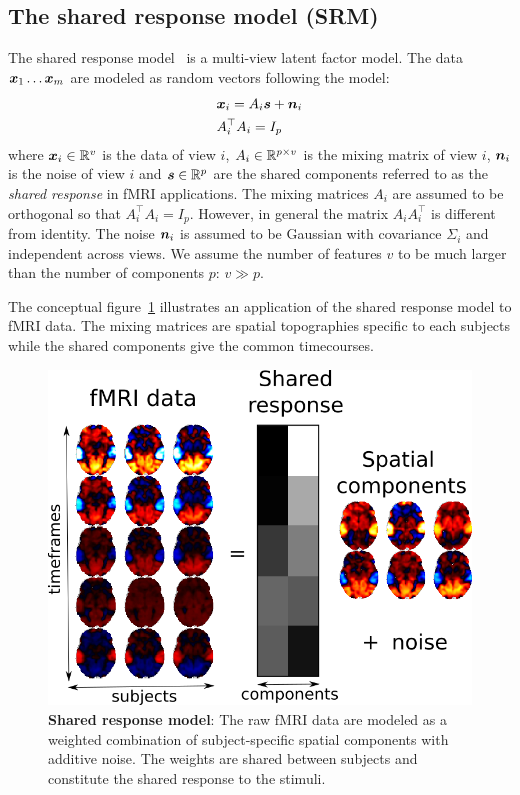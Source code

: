 \subsection{The shared response model (SRM)}
\label{sec:srm:review}
The shared response model~\cite{chen2015reduced} is a multi-view latent factor
model. The data $\boldsymbol{x}_1 \dots \boldsymbol{x}_m$ are modeled as random vectors following the model:
\begin{align}
 &\boldsymbol{x}_i = A_i \boldsymbol{s} + \boldsymbol{n}_i \\
  &A_i^{\top}A_i = I_p
  \label{eq:model:srm}
\end{align}
where $\boldsymbol{x}_i \in \mathbb{R}^v$ is the data of view $i$, $A_i \in \mathbb{R}^{p \times v}$ is the
mixing matrix of view $i$, $\boldsymbol{n}_i$ is the noise of view $i$ and $\boldsymbol{s} \in \mathbb{R}^p$ are the
shared components referred to as the \emph{shared response} in fMRI applications.
The mixing matrices
$A_i$ are assumed to be orthogonal so that $A_i^{\top}A_i = I_p$. However, in
general the matrix $A_i A_i^{\top}$ is different from identity. The noise
$\boldsymbol{n}_i$ is assumed to be Gaussian with covariance $\Sigma_i$ and independent
across views. We assume the number of features $v$ to be much larger than the
number of components $p$: $v \gg p$.

The conceptual figure~\ref{fig:srm:conceptual_figure} illustrates an 
application of the shared response model to fMRI data. The mixing
matrices are spatial topographies specific to each subjects while the shared
components give the common timecourses.

\begin{figure}
  \centering
  \includegraphics[scale=0.3]{figures/srm/conceptual_figure31.png}
  \caption{\textbf{Shared response model}: The raw fMRI data are modeled as a weighted combination of subject-specific spatial components with additive noise. The weights are shared between subjects and constitute the shared response to the stimuli.}
  \label{fig:srm:conceptual_figure}
\end{figure}

